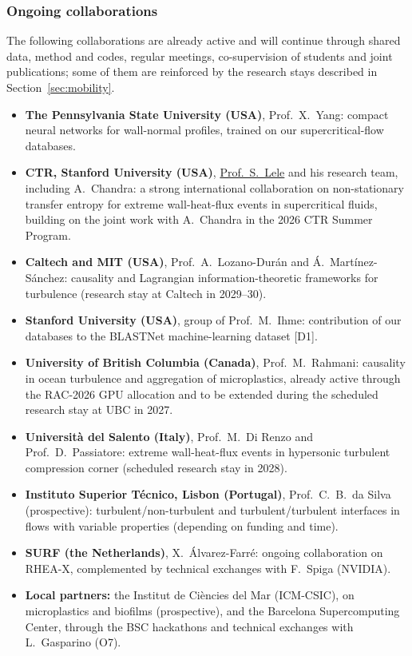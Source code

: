 \documentclass[11pt]{article}
\begin{document}
\subsubsection{Ongoing collaborations}
The following collaborations are already active and will continue through shared data, method and codes, regular meetings, co-supervision of students and joint publications; some of them are reinforced by the research stays described in Section~\ref{sec:mobility}.
\begin{itemize}
  \item \textbf{The Pennsylvania State University (USA)}, Prof.\ X.\ Yang: compact neural networks
  for wall-normal profiles, trained on our supercritical-flow databases.
  \item \textbf{CTR, Stanford University (USA)},
  \href{https://me.stanford.edu/people/sanjiva-lele}{Prof.\ S.\ Lele} and his research team, including   A.\ Chandra: a strong international collaboration on non-stationary transfer entropy for extreme wall-heat-flux events in supercritical fluids, building on the joint work with A.\ Chandra in the 2026 CTR Summer Program.
  \item \textbf{Caltech and MIT (USA)}, Prof.\ A.\ Lozano-Dur\'an and \'A.\ Mart\'inez-S\'anchez:   causality and Lagrangian information-theoretic frameworks for turbulence (research stay at Caltech in 2029--30).
  \item \textbf{Stanford University (USA)}, group of Prof.\ M.\ Ihme: contribution of our databases to the BLASTNet machine-learning dataset [D1].
  \item \textbf{University of British Columbia (Canada)}, Prof.\ M.\ Rahmani: causality in ocean turbulence and aggregation of microplastics, already active through the RAC-2026 GPU allocation and to be extended during the scheduled research stay at UBC in 2027.
  \item \textbf{Universit\`a del Salento (Italy)}, Prof.\ M.\ Di Renzo and Prof.\ D.\ Passiatore:
  extreme wall-heat-flux events in hypersonic turbulent compression corner (scheduled research stay in 2028).
  \item \textbf{Instituto Superior T\'ecnico, Lisbon (Portugal)}, Prof.\ C.\ B.\ da Silva
  (prospective): turbulent/non-turbulent and turbulent/turbulent interfaces in flows with
  variable properties (depending on funding and time).
  \item \textbf{SURF (the Netherlands)}, X.\ \'Alvarez-Farr\'e: ongoing collaboration on RHEA-X,
  complemented by technical exchanges with F.\ Spiga (NVIDIA).
  \item \textbf{Local partners:} the Institut de Ci\`encies del Mar (ICM-CSIC), on microplastics and biofilms (prospective), and the Barcelona Supercomputing Center, through the BSC hackathons and technical exchanges with L.\ Gasparino (O7).
\end{itemize}
\end{document}
